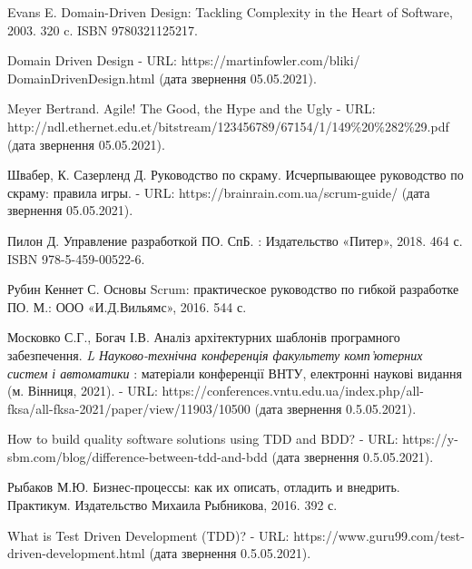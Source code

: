 \begingroup
\renewcommand{\section}[2]{\anonsection{Перелік посилань}}
\begin{thebibliography}{00}

      Evans E.
      Domain-Driven Design: Tackling Complexity in the Heart of Software,
      2003. 320 c. ISBN 9780321125217.

      Domain Driven Design -
      URL: https://martinfowler.com/bliki/
      DomainDrivenDesign.html
      (дата звернення 05.05.2021).

      Meyer Bertrand.
      Agile! The Good, the Hype and the Ugly -
      URL: http://ndl.ethernet.edu.et/bitstream/123456789/67154/1/149\%20\%282\%29.pdf
      (дата звернення 05.05.2021).

      Швабер, К. Сазерленд Д.
      Руководство по скраму. Исчерпывающее руководство по скраму: правила игры. -
      URL: https://brainrain.com.ua/scrum-guide/
      (дата звернення 05.05.2021).

      Пилон Д.
      Управление разработкой ПО. СпБ. : Издательство «Питер»,
      2018. 464 с. ISBN 978-5-459-00522-6.

      Рубин Кеннет С.
      Основы Scrum: практическое руководство по гибкой разработке ПО. М.: ООО «И.Д.Вильямс»,
      2016. 544 с. 

      Московко С.Г., Богач І.В.
      Аналіз архітектурних шаблонів програмного забезпечення.
			\emph{L Науково-технічна конференція факультету комп'ютерних систем і автоматики} :
			матеріали конференції ВНТУ, електронні наукові видання (м. Вінниця, 2021).
      - URL: https://conferences.vntu.edu.ua/index.php/all-fksa/all-fksa-2021/paper/view/11903/10500
			(дата звернення 0.5.05.2021).

			How to build quality software solutions using TDD and BDD? -
			URL: https://y-sbm.com/blog/difference-between-tdd-and-bdd
			(дата звернення 0.5.05.2021).

      Рыбаков М.Ю.
      Бизнес-процессы: как их описать, отладить и внедрить. Практикум.
      Издательство Михаила Рыбникова, 2016. 392 с.

			What is Test Driven Development (TDD)? -
      URL: https://www.guru99.com/test-driven-development.html
			(дата звернення 0.5.05.2021).


\end{thebibliography}
